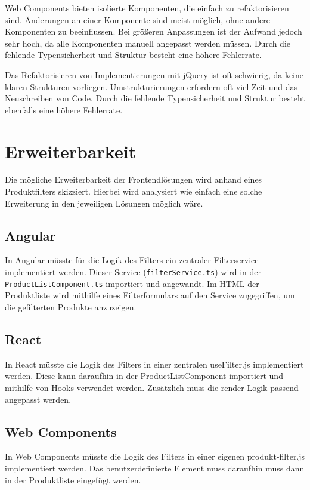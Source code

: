 \documentclass[oneside]{ausarbeitung}
\begin{document}
Web Components bieten isolierte Komponenten, die einfach zu refaktorisieren sind. Änderungen an einer Komponente sind meist möglich, ohne andere Komponenten zu beeinflussen. Bei größeren Anpassungen ist der Aufwand jedoch sehr hoch, da alle Komponenten manuell angepasst werden müssen. Durch die fehlende Typensicherheit und Struktur besteht eine höhere Fehlerrate.

Das Refaktorisieren von Implementierungen mit jQuery ist oft schwierig, da keine klaren Strukturen vorliegen. Umstrukturierungen erfordern oft viel Zeit und das Neuschreiben von Code. Durch die fehlende Typensicherheit und Struktur besteht ebenfalls eine höhere Fehlerrate.

\section{Erweiterbarkeit}

Die mögliche Erweiterbarkeit der Frontendlösungen wird anhand eines Produktfilters skizziert. Hierbei wird analysiert wie einfach eine solche Erweiterung in den jeweiligen Lösungen möglich wäre. 

\subsection{Angular}

In Angular müsste für die Logik des Filters ein zentraler Filterservice implementiert werden. Dieser Service (\texttt{filterService.ts}) wird in der \texttt{ProductListComponent.ts} importiert und angewandt. Im HTML der Produktliste wird mithilfe eines Filterformulars auf den Service zugegriffen, um die gefilterten Produkte anzuzeigen.

\subsection{React}

In React müsste die Logik des Filters in einer zentralen useFilter.js implementiert werden. Diese kann daraufhin in der ProductListComponent importiert und mithilfe von Hooks verwendet werden. Zusätzlich muss die render Logik passend angepasst werden. 

\subsection{Web Components}

In Web Components müsste die Logik des Filters in einer eigenen produkt-filter.js implementiert werden. Das benutzerdefinierte Element muss daraufhin muss dann in der Produktliste eingefügt werden. 
\end{document}
